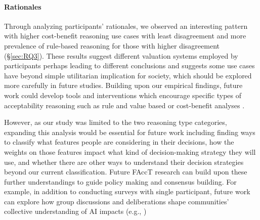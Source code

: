 
\paragraph{Rationales}
Through analyzing participants' rationales, we observed an interesting pattern with higher cost-benefit reasoning use cases with least disagreement and more prevalence of rule-based reasoning for those with higher disagreement (\S\ref{sec:RQ3}). These results suggest different valuation systems employed by participants perhaps leading to different conclusions and suggests some use cases have beyond simple utilitarian implication for society, which should be explored more carefully in future studies. Building upon our empirical findings, future work could develop tools and interventions which encourage specific types of acceptability reasoning such as rule and value based \cite{sorensen2024valueKaleidoscope} or cost-benefit analyses \cite{li2024safetyanalyst}. 

However, as our study was limited to the two reasoning type categories, expanding this analysis would be essential for future work including finding ways to classify what features people are considering in their decisions, how the weights on those features impact what kind of decision-making strategy they will use, and whether there are other ways to understand their decision strategies beyond our current classification. Future FAccT research can build upon these further understandings to guide policy making and consensus building. For example, in addition to conducting surveys with single participant, future work can explore how group discussions and deliberations shape communities' collective understanding of AI impacts (e.g., \citep{kuo2024policycraft, lee2019webuildai,devos2022toward, gordon2022jury,zhang2023deliberating})






